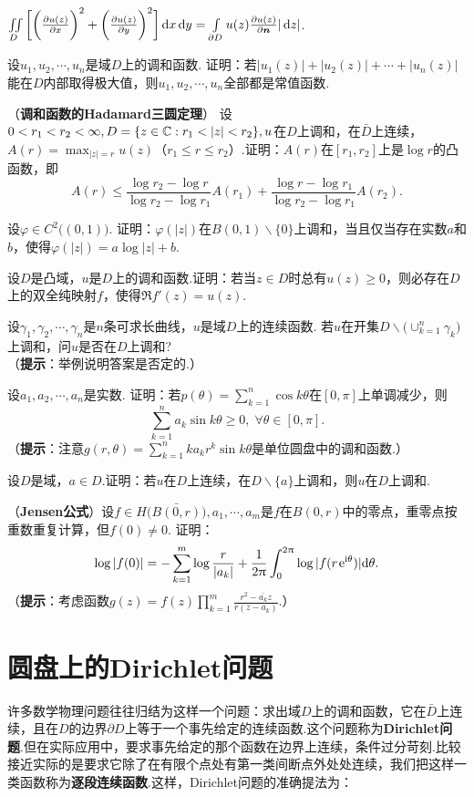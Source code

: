\begin{xiti}
\begin{enuma}
  \item $\iint\limits_D\bigg[\bigg(\frac{\partial u(z)}{\partial x}\bigg)^2+\bigg(\frac{\partial u(z)}{\partial y}\bigg)^2\bigg]
  \mathop{}\!\mathrm dx\mathop{}\!\mathrm dy=\int\limits_{\partial D}u(z)\frac{\partial u(z)}{\partial \boldsymbol n}|\mathop{}\!\mathrm dz|$.
\end{enuma}
\item 设$u_1,u_2,\cdots,u_n$是域$D$上的调和函数. 证明：若$|u_1(z)|+|u_2(z)|+\cdots+|u_n(z)|$能在$D$内部取得极大值，则$u_1,u_2,\cdots,u_n$全部都是常值函数.
\item （\textbf{调和函数的Hadamard三圆定理}）
设$0<r_1<r_2<\infty,D=\{z\in\MC:r_1<|z|<r_2\},u$在$D$上调和，在$\bar D$上连续，$A(r)=\max_{|z|=r}u(z)$（$r_1\le r\le r_2$）.证明：$A(r)$在$[r_1,r_2]$上是$\log r$的凸函数，即
\[A(r)\le\frac{\log r_2-\log r}{\log r_2-\log r_1}A(r_1)+\frac{\log r-\log r_1}
{\log r_2-\log r_1}A(r_2).\]
\item 设$\varphi\in C^2\big((0,1)\big)$. 证明：$\varphi(|z|)$在$B(0,1)\backslash\{0\}$上调和，当且仅当存在实数$a$和$b$，使得$\varphi(|z|)=a\log|z|+b$.
\item 设$D$是凸域，$u$是$D$上的调和函数.证明：若当$z\in D$时总有$u(z)\ge0$，则必存在$D$上的双全纯映射$f$，使得$\Re f'(z)=u(z)$.
\item 设$\gamma_1,\gamma_2,\cdots,\gamma_n$是$n$条可求长曲线，$u$是域$D$上的连续函数. 若$u$在开集$D\backslash\big(\operatorname*{\cup}_{k=1}^n\gamma_k\big)$上调和，问$u$是否在$D$上调和?\\
（\textbf{提示}：举例说明答案是否定的.）
\item 设$a_1,a_2,\cdots,a_n$是实数. 证明：若$p(\theta)=\sum_{k=1}^n\cos k\theta$在$[0,\pi]$上单调减少，则
    \[\sum_{k=1}^n a_k\sin k\theta\ge0,\;\forall \theta\in[0,\pi].\]
（\textbf{提示}：注意$g(r,\theta)=\sum_{k=1}^nka_kr^k\sin k\theta$是单位圆盘中的调和函数.）
\item 设$D$是域，$a\in D$.证明：若$u$在$D$上连续，在$D\backslash\{a\}$上调和，则$u$在$D$上调和.
\item （\textbf{Jensen公式}）设$f\in H\big(\bar{B(0,r)}\big),a_1,\cdots,a_m$是$f$在$B(0,r)$中的零点，重零点按重数重复计算，但$f(0)\ne0$. 证明：
\[\log|f(0)|=-\sum_{k=1}^m\log\frac r{|a_k|}+\frac1{2\uppi}\int_0^{2\uppi}
\log|f(r\operatorname{\!\!\;\mathrm e}^{\mathrm i\theta})|\textrm d\theta.\]
（\textbf{提示}：考虑函数$g(z)=f(z)\prod_{k=1}^m\frac{r^2-\bar{a_k}z}{r(z-a_k)}$.）
\end{xiti}

\section{圆盘上的Dirichlet问题\label{sec8.2}}
许多数学物理问题往往归结为这样一个问题：求出域$D$上的调和函数，它在$\bar D$上连续，且在$D$的边界$\partial D$上等于一个事先给定的连续函数.这个问题称为\textbf{Dirichlet问题}.但在实际应用中，要求事先给定的那个函数在边界上连续，条件过分苛刻.比较接近实际的是要求它除了在有限个点处有第一类间断点外处处连续，我们把这样一类函数称为\textbf{逐段连续函数}.这样，Dirichlet问题的准确提法为：


